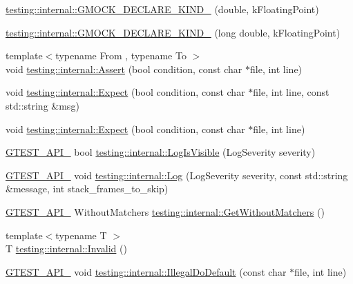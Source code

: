 \begin{DoxyCompactItemize}
\item 
\mbox{\hyperlink{namespacetesting_1_1internal_a45748f4c08b868cb4939081769cdc7b1}{testing\+::internal\+::\+G\+M\+O\+C\+K\+\_\+\+D\+E\+C\+L\+A\+R\+E\+\_\+\+K\+I\+N\+D\+\_\+}} (double, k\+Floating\+Point)
\item 
\mbox{\hyperlink{namespacetesting_1_1internal_af46fdd94d8aea0da729b554de443315f}{testing\+::internal\+::\+G\+M\+O\+C\+K\+\_\+\+D\+E\+C\+L\+A\+R\+E\+\_\+\+K\+I\+N\+D\+\_\+}} (long double, k\+Floating\+Point)
\item 
{\footnotesize template$<$typename From , typename To $>$ }\\void \mbox{\hyperlink{namespacetesting_1_1internal_a7a259643b7f2d23ce2b757728df42c99}{testing\+::internal\+::\+Assert}} (bool condition, const char $\ast$file, int line)
\item 
void \mbox{\hyperlink{namespacetesting_1_1internal_ad93379317e10862a77b9fb90aa96e083}{testing\+::internal\+::\+Expect}} (bool condition, const char $\ast$file, int line, const std\+::string \&msg)
\item 
void \mbox{\hyperlink{namespacetesting_1_1internal_a0dfe8a755bd02aa5ea162764b61a9d97}{testing\+::internal\+::\+Expect}} (bool condition, const char $\ast$file, int line)
\item 
\mbox{\hyperlink{_obj__test_2lib_2googletest-release-1_88_81_2googletest_2include_2gtest_2internal_2gtest-port_8h_aa73be6f0ba4a7456180a94904ce17790}{G\+T\+E\+S\+T\+\_\+\+A\+P\+I\+\_\+}} bool \mbox{\hyperlink{namespacetesting_1_1internal_a69ffdba5ee36743e88d8f89b79e566ff}{testing\+::internal\+::\+Log\+Is\+Visible}} (Log\+Severity severity)
\item 
\mbox{\hyperlink{_obj__test_2lib_2googletest-release-1_88_81_2googletest_2include_2gtest_2internal_2gtest-port_8h_aa73be6f0ba4a7456180a94904ce17790}{G\+T\+E\+S\+T\+\_\+\+A\+P\+I\+\_\+}} void \mbox{\hyperlink{namespacetesting_1_1internal_a8a57ce0412334a3f487bbaa8321febbe}{testing\+::internal\+::\+Log}} (Log\+Severity severity, const std\+::string \&message, int stack\+\_\+frames\+\_\+to\+\_\+skip)
\item 
\mbox{\hyperlink{_obj__test_2lib_2googletest-release-1_88_81_2googletest_2include_2gtest_2internal_2gtest-port_8h_aa73be6f0ba4a7456180a94904ce17790}{G\+T\+E\+S\+T\+\_\+\+A\+P\+I\+\_\+}} Without\+Matchers \mbox{\hyperlink{namespacetesting_1_1internal_ad4e02ea077a717f95a10a03c10272f1c}{testing\+::internal\+::\+Get\+Without\+Matchers}} ()
\item 
{\footnotesize template$<$typename T $>$ }\\T \mbox{\hyperlink{namespacetesting_1_1internal_a3316c24e8a79f5def3e85d763ae50854}{testing\+::internal\+::\+Invalid}} ()
\item 
\mbox{\hyperlink{_obj__test_2lib_2googletest-release-1_88_81_2googletest_2include_2gtest_2internal_2gtest-port_8h_aa73be6f0ba4a7456180a94904ce17790}{G\+T\+E\+S\+T\+\_\+\+A\+P\+I\+\_\+}} void \mbox{\hyperlink{namespacetesting_1_1internal_aa67e1e9d28122eedffbb7b6636824f2d}{testing\+::internal\+::\+Illegal\+Do\+Default}} (const char $\ast$file, int line)
\end{DoxyCompactItemize}


